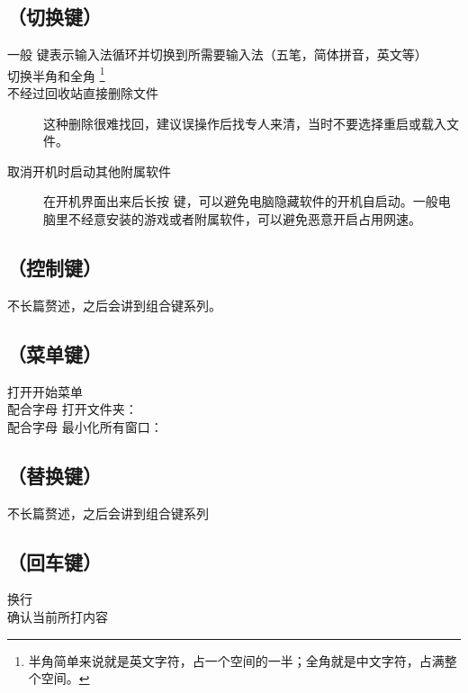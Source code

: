\subsection{ （切换键）}
\begin{description}
	\item [一般  键表示输入法循环并切换到所需要输入法（五笔，简体拼音，英文等）]
	\item [切换半角和全角%
	\footnote{半角简单来说就是英文字符，占一个空间的一半；全角就是中文字符，占满整个空间。}]
	\item [ 不经过回收站直接删除文件]
	这种删除很难找回，建议误操作后找专人来清，当时不要选择重启或载入文件。
	\item [取消开机时启动其他附属软件]
	在开机界面出来后长按  键，可以避免电脑隐藏软件的开机自启动。一般电脑里不经意安装的游戏或者附属软件，可以避免恶意开启占用网速。
\end{description}
\subsection{ （控制键）}
不长篇赘述，之后会讲到组合键系列。
\subsection{ （菜单键）}
\begin{description}
	\item [打开开始菜单]
	\item [配合字母  打开文件夹：]
	\item [配合字母  最小化所有窗口：]
\end{description}
\subsection{ （替换键）}
不长篇赘述，之后会讲到组合键系列
\subsection{ （回车键）}
\begin{description}
	\item [换行]
	\item [确认当前所打内容]
\end{description}